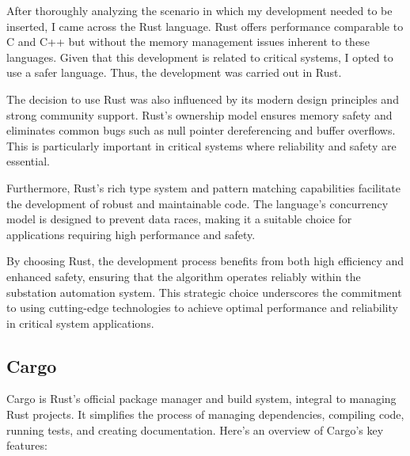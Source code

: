After thoroughly analyzing the scenario in which my development needed to be inserted, I came across the Rust language. Rust offers performance comparable to C and C++ but without the memory management issues inherent to these languages. Given that this development is related to critical systems, I opted to use a safer language. Thus, the development was carried out in Rust.

The decision to use Rust was also influenced by its modern design principles and strong community support. Rust’s ownership model ensures memory safety and eliminates common bugs such as null pointer dereferencing and buffer overflows. This is particularly important in critical systems where reliability and safety are essential.

Furthermore, Rust's rich type system and pattern matching capabilities facilitate the development of robust and maintainable code. The language's concurrency model is designed to prevent data races, making it a suitable choice for applications requiring high performance and safety.

By choosing Rust, the development process benefits from both high efficiency and enhanced safety, ensuring that the algorithm operates reliably within the substation automation system. This strategic choice underscores the commitment to using cutting-edge technologies to achieve optimal performance and reliability in critical system applications.

\subsection{Cargo}

Cargo is Rust's official package manager and build system, integral to managing Rust projects. It simplifies the process of managing dependencies, compiling code, running tests, and creating documentation. Here's an overview of Cargo's key features:

